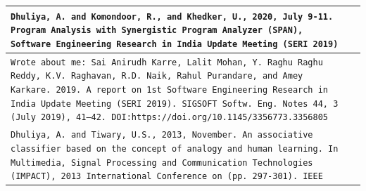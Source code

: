 \documentclass[a4paper,12pt]{article}
\begin{document}
\begin{flushleft}
\begin{tabular}{ m{} M{0.05\textwidth}}
\rule[13pt]{0ex}{0ex}\texttt{Dhuliya, A. and Komondoor, R., and Khedker, U., 2020, July 9-11. Program Analysis with Synergistic Program Analyzer (SPAN), Software Engineering Research in India Update Meeting (SERI 2019)} & \\ \hline

\rule[13pt]{0ex}{0ex}\texttt{Wrote about me: Sai Anirudh Karre, Lalit Mohan, Y. Raghu Raghu Reddy, K.V. Raghavan, R.D. Naik, Rahul Purandare, and Amey Karkare. 2019. A report on 1st Software Engineering Research in India Update Meeting (SERI 2019). SIGSOFT Softw. Eng. Notes 44, 3 (July 2019), 41–42. DOI:https://doi.org/10.1145/3356773.3356805} & \\ \hline

\rule[13pt]{0ex}{0ex}\texttt{Dhuliya, A. and Tiwary, U.S., 2013, November. An associative classifier based on the concept of analogy and human learning. In Multimedia, Signal Processing and Communication Technologies (IMPACT), 2013 International Conference on (pp. 297-301). IEEE} & \\ \hline
\end{tabular}

%
%
%
%
%



\end{flushleft}
\end{document}
